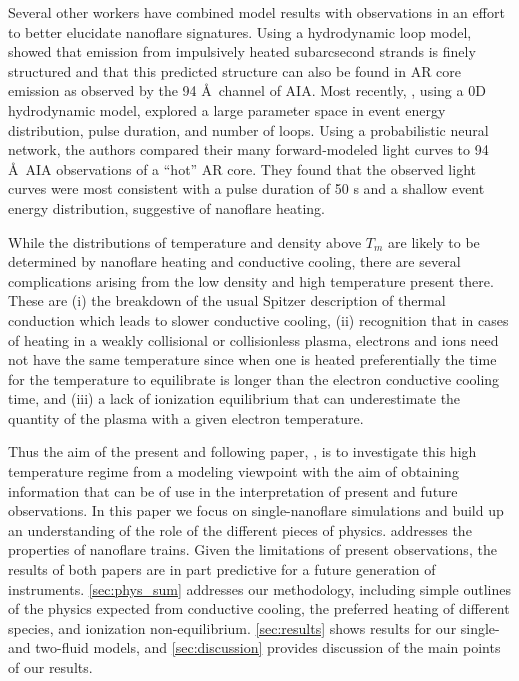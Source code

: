\documentclass[]{aastex}
\newcommand{\ang}{\AA~}
\begin{document}
%
	\par Several other workers have combined model results with observations in an effort to better elucidate nanoflare signatures. Using a hydrodynamic loop model, \citet{reale_solar_2011} showed that emission from impulsively heated subarcsecond strands is finely structured and that this predicted structure can also be found in AR core emission as observed by the 94 \ang channel of AIA. Most recently, \citet{tajfirouze_time-resolved_2016}, using a 0D hydrodynamic model, explored a large parameter space in event energy distribution, pulse duration, and number of loops. Using a probabilistic neural network, the authors compared their many forward-modeled light curves to 94 \ang AIA observations of a ``hot'' AR core. They found that the observed light curves were most consistent with a pulse duration of 50 s and a shallow event energy distribution, suggestive of nanoflare heating.
%
	\par While the distributions of temperature and density above $T_m$ are likely to be determined by nanoflare heating and conductive cooling, there are several complications arising from the low density and high temperature present there. These are (i) the breakdown of the usual Spitzer description of thermal conduction which leads to slower conductive cooling, (ii) recognition that in cases of heating in a weakly collisional or collisionless plasma, electrons and ions need not have the same temperature since when one is heated preferentially the time for the temperature to equilibrate is longer than the electron conductive cooling time, and (iii) a lack of ionization equilibrium that can underestimate the quantity of the plasma with a given electron temperature.
%
	\par Thus the aim of the present and following paper, \citet[in preparation]{barnes_inference_2016-1} , is to investigate this high temperature regime from a modeling viewpoint with the aim of obtaining information that can be of use in the interpretation of present and future observations. In this paper we focus on single-nanoflare simulations and build up an understanding of the role of the different pieces of physics.  addresses the properties of nanoflare trains. Given the limitations of present observations, the results of both papers are in part predictive for a future generation of instruments. \autoref{sec:phys_sum} addresses our methodology, including simple outlines of the physics expected from conductive cooling, the preferred heating of different species, and ionization non-equilibrium. \autoref{sec:results} shows results for our single- and two-fluid models, and \autoref{sec:discussion} provides discussion of the main points of our results.
\end{document}
